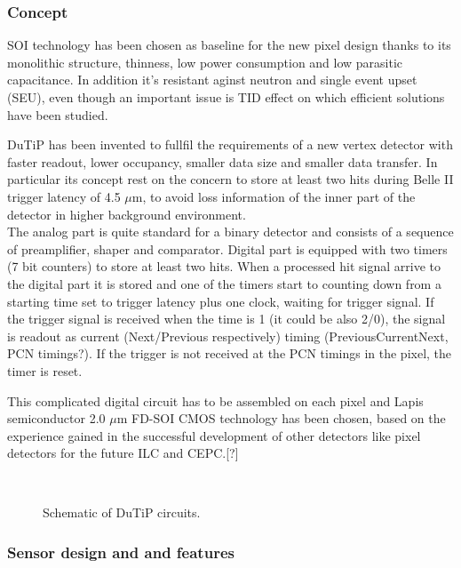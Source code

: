 \subsubsection{Concept}

SOI technology has been chosen as baseline for the new pixel design thanks to its monolithic structure, thinness, low power consumption and low parasitic capacitance. In addition it's resistant aginst neutron and single event upset (SEU), even though an important issue is TID effect on which efficient solutions have been studied.

DuTiP has been invented to fullfil the requirements of a new vertex detector with faster readout, lower occupancy, smaller data size and smaller data transfer. In particular its concept rest on the concern to store at least two hits during Belle II trigger latency of 4.5 $\mu$m, to avoid loss information of the inner part of the detector in higher background environment. \\
The analog part is quite standard for a binary detector and consists of a sequence of preamplifier, shaper and comparator. Digital part is equipped with two timers (7 bit counters) to store at least two hits. When a processed hit signal arrive to the digital part it is stored and one of the timers start to counting down from a starting time set to trigger latency plus one clock, waiting for trigger signal. If the trigger signal is received when the time is 1 (it could be also 2/0), the signal is readout as current (Next/Previous respectively) timing (PreviousCurrentNext, PCN timings?). If the trigger is not received at the PCN timings in the pixel, the timer is reset. 

This complicated digital circuit has to be assembled on each pixel and Lapis semiconductor 2.0 $\mu$m FD-SOI CMOS technology has been chosen, based on the experience gained in the successful development of other detectors like pixel detectors for the future ILC and CEPC.[?]

\begin{figure}[h!]
\centering
{}\quad
{}\\
\caption{Schematic of DuTiP circuits.}
\label{SOI}
\end{figure}

\subsubsection{Sensor design and and features}

